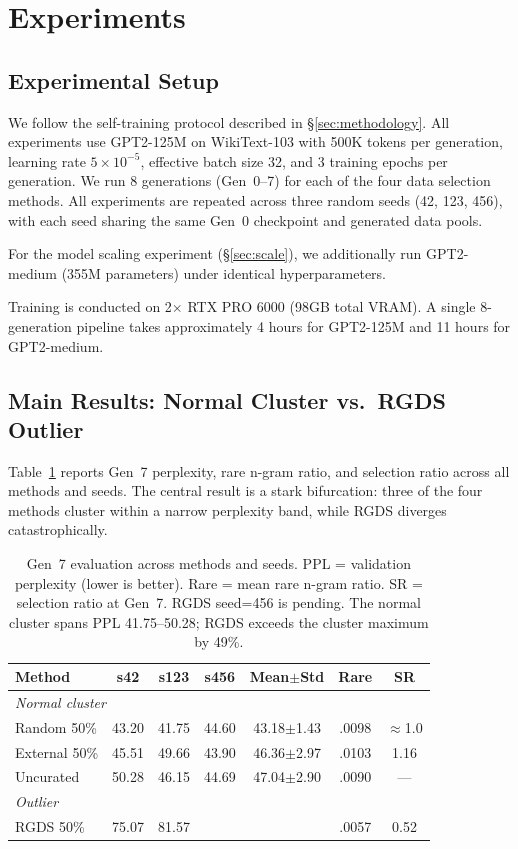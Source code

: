 \section{Experiments}

\subsection{Experimental Setup}

We follow the self-training protocol described in \S\ref{sec:methodology}. All experiments use GPT2-125M on WikiText-103 with 500K tokens per generation, learning rate $5 \times 10^{-5}$, effective batch size 32, and 3 training epochs per generation. We run 8 generations (Gen~0--7) for each of the four data selection methods. All experiments are repeated across three random seeds (42, 123, 456), with each seed sharing the same Gen~0 checkpoint and generated data pools.

For the model scaling experiment (\S\ref{sec:scale}), we additionally run GPT2-medium (355M parameters) under identical hyperparameters.

Training is conducted on 2$\times$ RTX PRO 6000 (98GB total VRAM). A single 8-generation pipeline takes approximately 4 hours for GPT2-125M and 11 hours for GPT2-medium.

\subsection{Main Results: Normal Cluster vs.\ RGDS Outlier}
\label{sec:main_results}

Table~\ref{tab:gen7_summary} reports Gen~7 perplexity, rare n-gram ratio, and selection ratio across all methods and seeds. The central result is a stark bifurcation: three of the four methods cluster within a narrow perplexity band, while RGDS diverges catastrophically.

\begin{table}[t]
\centering
\small
\begin{tabular}{lcccccc}
\toprule
\textbf{Method} & \textbf{s42} & \textbf{s123} & \textbf{s456} & \textbf{Mean$\pm$Std} & \textbf{Rare} & \textbf{SR} \\
\midrule
\multicolumn{7}{l}{\textit{Normal cluster}} \\
Random 50\% & 43.20 & 41.75 & 44.60 & 43.18$\pm$1.43 & .0098 & $\approx$1.0 \\
External 50\% & 45.51 & 49.66 & 43.90 & 46.36$\pm$2.97 & .0103 & 1.16 \\
Uncurated & 50.28 & 46.15 & 44.69 & 47.04$\pm$2.90 & .0090 & --- \\
\midrule
\multicolumn{7}{l}{\textit{Outlier}} \\
RGDS 50\% & 75.07 & 81.57 & \placeholder{--} & \placeholder{--} & .0057 & 0.52 \\
\bottomrule
\end{tabular}
\caption{Gen~7 evaluation across methods and seeds. PPL = validation perplexity (lower is better). Rare = mean rare n-gram ratio. SR = selection ratio at Gen~7. RGDS seed=456 is pending. The normal cluster spans PPL 41.75--50.28; RGDS exceeds the cluster maximum by 49\%.}
\label{tab:gen7_summary}
\end{table}

